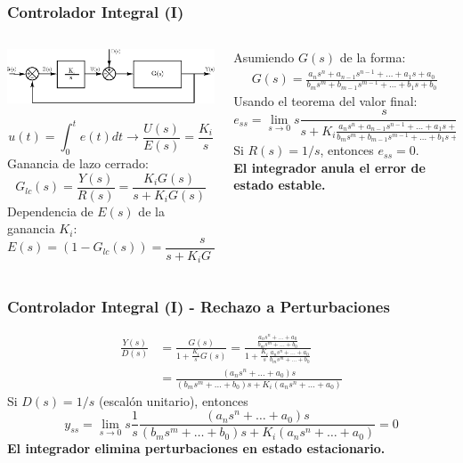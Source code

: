 \documentclass[aspectratio=169,handout]{beamer}
\theoremstyle{definition}
\theoremstyle{plain}
\theoremstyle{remark}
\begin{document}
\begin{frame}[<+->]\frametitle{Controlador Integral (I)}
\begin{columns}
\begin{column}{0.5\textwidth}
\begin{center}
  \includegraphics[width=7cm]{images/Icontroller.eps}
\end{center}
\pause
\begin{equation*}
  u(t) = \int_0^t e(t) dt \longrightarrow \frac{U(s)}{E(s)} = \frac{K_i}{s}
\end{equation*}
\pause
Ganancia de lazo cerrado:
\begin{equation*}
  G_{lc}(s) = \frac{Y(s)}{R(s)} = \frac{K_i G(s)}{s + K_i G(s)}
\end{equation*}
\pause
Dependencia de $E(s)$ de la ganancia $K_i$:
\begin{equation*}
E(s) = (1-G_{lc}(s)) = \frac{s}{s+K_i G(s)} R(s)
\end{equation*}
\pause
\end{column}
\begin{column}{0.5\textwidth}
Asumiendo $G(s)$ de la forma:
\begin{align*}
  G(s) = \frac{a_n s^n + a_{n-1} s^{n-1} + \dots + a_1 s + a_0}{b_m s^m + b_{m-1} s^{m-1} + \dots + b_1 s + b_0}
\end{align*}
\pause
Usando el teorema del valor final:
\begin{equation*}
  e_{ss} = \lim_{s \rightarrow 0} s \frac{s}{s + K_i \frac{a_n s^n + a_{n-1} s^{n-1} + \dots + a_1 s + a_0}{b_m s^m + b_{m-1} s^{m-1} + \dots + b_1 s + b_0}}R(s) 
\end{equation*}
\pause
Si $R(s) = 1/s$, entonces $e_{ss} = 0$.\\
\textbf{El integrador anula el error de estado estable.}
\end{column}
\end{columns}
\end{frame}

\begin{frame}[<+->]\frametitle{Controlador Integral (I) - Rechazo a Perturbaciones}
\begin{align*}
  \frac{Y(s)}{D(s)} &= \frac{G(s)}{1+\frac{K_i}{s}G(s)} = \frac{\frac{a_n s^n + \dots + a_0}{b_m s^m + \dots + b_0}}{1 + \frac{K_i}{s}\frac{a_n s^n + \dots + a_0}{b_m s^m + \dots + b_0}}\\
  &= \frac{(a_n s^n + \dots + a_0)s}{(b_m s^m + \dots + b_0)s + K_i(a_n s^n + \dots + a_0)} 
\end{align*}
\pause
Si $D(s) = 1/s$ (escalón unitario), entonces
\begin{equation*}
  y_{ss} = \lim_{s \rightarrow 0} s \frac{1}{s} \frac{(a_n s^n + \dots + a_0)s}{(b_m s^m + \dots + b_0)s + K_i(a_n s^n + \dots + a_0)} = 0
\end{equation*}
\pause
\textbf{El integrador elimina perturbaciones en estado estacionario.}
\end{frame}
\end{document}

